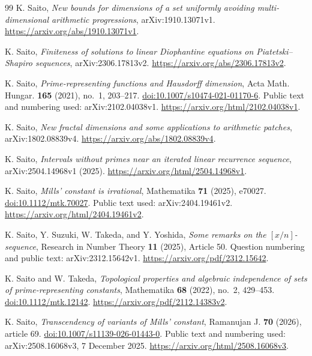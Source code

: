 \documentclass[11pt,a4paper]{article}
\theoremstyle{definition}
\theoremstyle{remark}
\numberwithin{equation}{section}
\begin{document}
\begin{thebibliography}{99}
K. Saito, \emph{New bounds for dimensions of a set uniformly avoiding multi-dimensional arithmetic progressions},
arXiv:1910.13071v1.
\url{https://arxiv.org/abs/1910.13071v1}.

K. Saito, \emph{Finiteness of solutions to linear Diophantine equations on Piatetski--Shapiro sequences},
arXiv:2306.17813v2.
\url{https://arxiv.org/abs/2306.17813v2}.

K. Saito, \emph{Prime-representing functions and Hausdorff dimension},
Acta Math. Hungar. \textbf{165} (2021), no.~1, 203--217.
\href{https://doi.org/10.1007/s10474-021-01170-6}{doi:10.1007/s10474-021-01170-6}.
Public text and numbering used: arXiv:2102.04038v1.
\url{https://arxiv.org/html/2102.04038v1}.

K. Saito, \emph{New fractal dimensions and some applications to arithmetic patches},
arXiv:1802.08839v4.
\url{https://arxiv.org/abs/1802.08839v4}.

K. Saito, \emph{Intervals without primes near an iterated linear recurrence
sequence}, arXiv:2504.14968v1 (2025).
\url{https://arxiv.org/html/2504.14968v1}.

K. Saito, \emph{Mills' constant is irrational},
Mathematika \textbf{71} (2025), e70027.
\href{https://doi.org/10.1112/mtk.70027}{doi:10.1112/mtk.70027}.
Public text used: arXiv:2404.19461v2.
\url{https://arxiv.org/html/2404.19461v2}.

K. Saito, Y. Suzuki, W. Takeda, and Y. Yoshida,
\emph{Some remarks on the $[x/n]$-sequence},
Research in Number Theory \textbf{11} (2025), Article 50.
Question numbering and public text: arXiv:2312.15642v1.
\url{https://arxiv.org/pdf/2312.15642}.

K. Saito and W. Takeda,
\emph{Topological properties and algebraic independence of sets of
prime-representing constants},
Mathematika \textbf{68} (2022), no.~2, 429--453.
\href{https://doi.org/10.1112/mtk.12142}{doi:10.1112/mtk.12142}.
\url{https://arxiv.org/pdf/2112.14383v2}.

K. Saito, \emph{Transcendency of variants of Mills' constant},
Ramanujan J. \textbf{70} (2026), article 69.
\href{https://doi.org/10.1007/s11139-026-01443-0}{doi:10.1007/s11139-026-01443-0}.
Public text and numbering used: arXiv:2508.16068v3, 7 December 2025.
\url{https://arxiv.org/html/2508.16068v3}.


\end{thebibliography}
\end{document}
